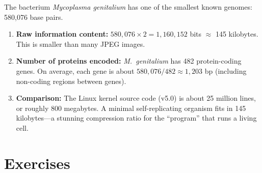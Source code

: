 \begin{example}
The bacterium \emph{Mycoplasma genitalium} has one of the smallest known genomes: 580,076 base pairs.

\begin{enumerate}[label=(\alph*)]
  \item \textbf{Raw information content:} $580{,}076 \times 2 = 1{,}160{,}152$ bits $\approx$ 145 kilobytes. This is smaller than many JPEG images.

  \item \textbf{Number of proteins encoded:} \emph{M.\ genitalium} has 482 protein-coding genes. On average, each gene is about $580{,}076/482 \approx 1{,}203$ bp (including non-coding regions between genes).

  \item \textbf{Comparison:} The Linux kernel source code (v5.0) is about 25 million lines, or roughly 800 megabytes. A minimal self-replicating organism fits in 145 kilobytes---a stunning compression ratio for the ``program'' that runs a living cell.
\end{enumerate}
\end{example}

\section{Exercises}
\label{sec:ch1-exercises}

